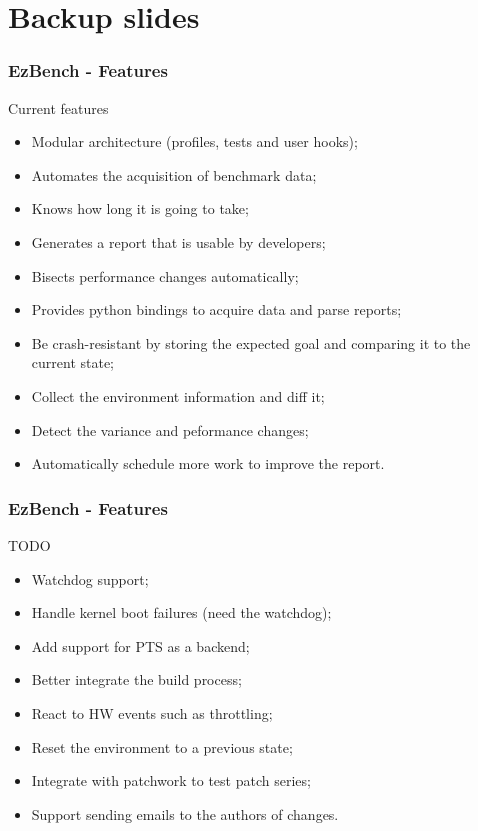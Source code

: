 \documentclass[11pt,english,compress]{beamer}
\begin{document}
\section*{Backup slides}
\begin{frame}
	\frametitle{EzBench - Features}

	\begin{block}{Current features}
		\begin{itemize}
			\item Modular architecture (profiles, tests and user hooks);\pause
			\item Automates the acquisition of benchmark data;\pause
			\item Knows how long it is going to take;\pause
			\item Generates a report that is usable by developers;\pause
			\item Bisects performance changes automatically;\pause
			\item Provides python bindings to acquire data and parse reports;\pause
			\item Be crash-resistant by storing the expected goal and comparing it to the current state;\pause
			\item Collect the environment information and diff it;\pause
			\item Detect the variance and peformance changes;\pause
			\item Automatically schedule more work to improve the report.
		\end{itemize}
	\end{block}
\end{frame}

\begin{frame}
	\frametitle{EzBench - Features}

	\begin{block}{TODO}
		\begin{itemize}
			\item Watchdog support;\pause
			\item Handle kernel boot failures (need the watchdog);\pause
			\item Add support for PTS as a backend;\pause
			\item Better integrate the build process;\pause
			\item React to HW events such as throttling;\pause
			\item Reset the environment to a previous state;\pause
			\item Integrate with patchwork to test patch series;\pause
			\item Support sending emails to the authors of changes.
		\end{itemize}
	\end{block}
\end{frame}
\end{document}
